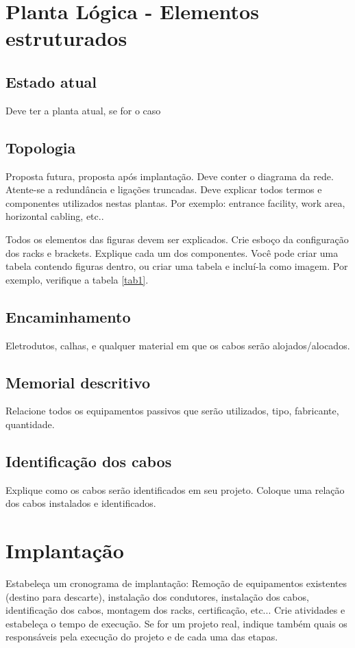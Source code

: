 \documentclass[	DIV=calc,%
							paper=a4,%
							fontsize=12pt,%
							onecolumn]{scrartcl}	 					%
\begin{document}
\clearpage
{}
\recalctypearea


\section{Planta Lógica - Elementos estruturados}

\subsection{Estado atual}
Deve ter a planta atual, se for o caso

\subsection{Topologia}
Proposta futura, proposta após implantação.
Deve conter o diagrama da rede. Atente-se a redundância  e ligações truncadas.
Deve explicar todos termos e componentes utilizados nestas plantas. Por exemplo: entrance facility, work area, horizontal cabling, etc..

Todos os elementos das figuras devem ser explicados. 
Crie esboço da configuração dos racks e brackets. Explique cada um dos componentes. Você pode criar uma tabela contendo figuras dentro, ou criar uma tabela e incluí-la como imagem. Por exemplo, verifique a tabela \ref{tab1}.



\subsection{Encaminhamento}
Eletrodutos, calhas, e qualquer material em que os cabos serão alojados/alocados.

\subsection{Memorial descritivo}

Relacione todos os equipamentos passivos que serão utilizados, tipo, fabricante, quantidade.

\subsection{Identificação dos cabos}
Explique como os cabos serão identificados em seu projeto. Coloque uma relação dos cabos instalados e identificados.

\section{Implantação}
Estabeleça um cronograma de implantação:
Remoção de equipamentos existentes (destino para descarte), instalação dos condutores, instalação dos cabos, 
identificação dos cabos, montagem dos racks, certificação, etc... Crie atividades e estabeleça o tempo de execução. Se for um projeto real, indique também quais os responsáveis pela execução do projeto e de cada uma das etapas.
\end{document}
